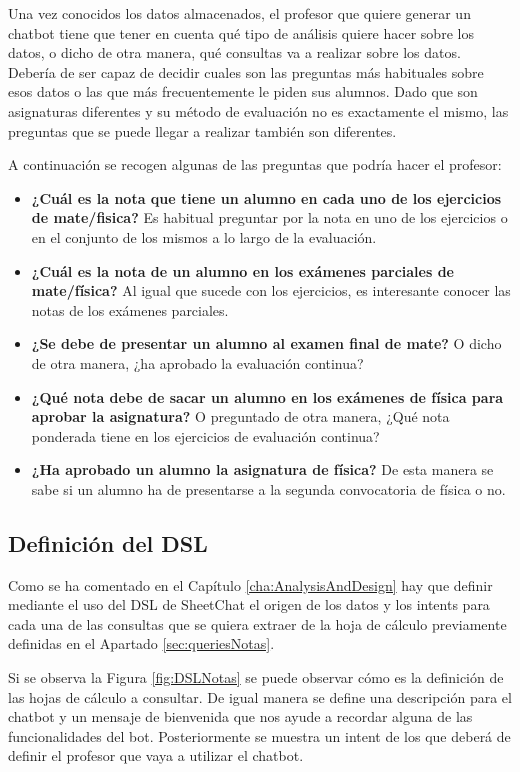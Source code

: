 Una vez conocidos los datos almacenados, el profesor que quiere generar un chatbot tiene que tener en cuenta qué tipo de análisis quiere hacer sobre los datos, o dicho de otra manera, qué consultas va a realizar sobre los datos. Debería de ser capaz de decidir cuales son las preguntas más habituales sobre esos datos o las que más frecuentemente le piden sus alumnos. Dado que son asignaturas diferentes y su método de evaluación no es exactamente el mismo, las preguntas que se puede llegar a realizar también son diferentes.

A continuación se recogen algunas de las preguntas que podría hacer el profesor:
\begin{itemize}
	\item \textbf{¿Cuál es la nota que tiene un alumno en cada uno de los ejercicios de mate/fisica?} Es habitual preguntar por la nota en uno de los ejercicios o en el conjunto de los mismos a lo largo de la evaluación.
	\item \textbf{¿Cuál es la nota de un alumno en los exámenes parciales de mate/física?} Al igual que sucede con los ejercicios, es interesante conocer las notas de los exámenes parciales.
	\item \textbf{¿Se debe de presentar un alumno al examen final de mate?} O dicho de otra manera, ¿ha aprobado la evaluación continua?
	\item \textbf{¿Qué nota debe de sacar un alumno en los exámenes de física para aprobar la asignatura?} O preguntado de otra manera, ¿Qué nota ponderada tiene en los ejercicios de evaluación continua?
	\item \textbf{¿Ha aprobado un alumno la asignatura de física?} De esta manera se sabe si un alumno ha de presentarse a la segunda convocatoria de física o no.
\end{itemize}

\subsection{Definición del DSL}

Como se ha comentado en el Capítulo \ref{cha:AnalysisAndDesign} hay que definir mediante el uso del DSL de SheetChat el origen de los datos y los intents para cada una de las consultas que se quiera extraer de la hoja de cálculo previamente definidas en el Apartado \ref{sec:queriesNotas}.

Si se observa la Figura \ref{fig:DSLNotas} se puede observar cómo es la definición de las hojas de cálculo a consultar. De igual manera se define una descripción para el chatbot y un mensaje de bienvenida que nos ayude a recordar alguna de las funcionalidades del bot. Posteriormente se muestra un intent de los que deberá de definir el profesor que vaya a utilizar el chatbot.

